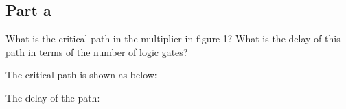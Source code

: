 \documentclass[12pt, a4paper]{article}
\begin{document}
	\subsection*{Part a}
	What is the critical path in the multiplier in figure 1? What is the delay of this path in terms of the number of logic gates?
	\begin{center}
	\end{center}
	
	The critical path is shown as below:
	\begin{center}
	\end{center}
	
	The delay of the path:
	
\end{document}
